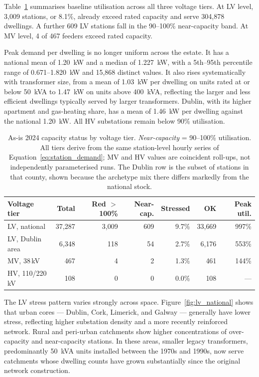 \documentclass[preprint,12pt]{elsarticle}
\begin{document}
Table~\ref{tab:breach_summary} summarises baseline utilisation across
all three voltage tiers.
At LV level, 3,009 stations, or 8.1\%, already exceed rated capacity and
serve 304,878 dwellings.
A further 609 LV stations fall in the 90--100\% near-capacity band.
At MV level, 4 of 467 feeders exceed rated capacity.

Peak demand per dwelling is no longer uniform across the estate. It has a
national mean of 1.20~kW and a median of 1.227~kW, with a 5th--95th
percentile range of 0.671--1.820~kW and 15,868 distinct values. It also rises
systematically with transformer size, from a mean of 1.03~kW per dwelling on
units rated at or below 50~kVA to 1.47~kW on units above 400~kVA, reflecting
the larger and less efficient dwellings typically served by larger
transformers. Dublin, with its higher apartment and gas-heating share, has a
mean of 1.46~kW per dwelling against the national 1.20~kW.
All HV substations remain below 90\% utilisation.

\begin{table}[H]
\centering
\caption{As-is 2024 capacity status by voltage tier.
  \textit{Near-capacity} = 90--100\% utilisation.
  All tiers derive from the same station-level hourly series of
  Equation~\eqref{eq:station_demand}; MV and HV values are coincident
  roll-ups, not independently parameterised runs. The Dublin row is the
  subset of stations in that county, shown because the archetype mix there
  differs markedly from the national stock.}
\label{tab:breach_summary}
\small
\begin{tabularx}{\textwidth}{Xrrrrrr}
\toprule
\textbf{Voltage tier} &
\textbf{Total} & \textbf{Red $>$100\%} & \textbf{Near-cap.} &
\textbf{Stressed} & \textbf{OK} & \textbf{Peak util.} \\
\midrule
LV, national   & 37{,}287 & 3{,}009 & 609 & 9.7\% & 33{,}669 & 997\% \\
LV, Dublin area &  6{,}348 &     118 &  54 & 2.7\% &  6{,}176 & 553\% \\
MV, 38\,kV     &    467   &       4 &   2 & 1.3\% &    461   & 144\% \\
HV, 110/220\,kV &   108   &       0 &   0 & 0.0\% &    108   &  --- \\
\bottomrule
\end{tabularx}
\end{table}

The LV stress pattern varies strongly across space.
Figure~\ref{fig:lv_national} shows that urban cores --- Dublin, Cork,
Limerick, and Galway --- generally have lower stress, reflecting higher
substation density and a more recently reinforced network.
Rural and peri-urban catchments show higher concentrations of over-capacity
and near-capacity stations.
In these areas, smaller legacy transformers, predominantly 50~kVA units
installed between the 1970s and 1990s, now serve catchments whose dwelling
counts have grown substantially since the original network construction.
\end{document}

